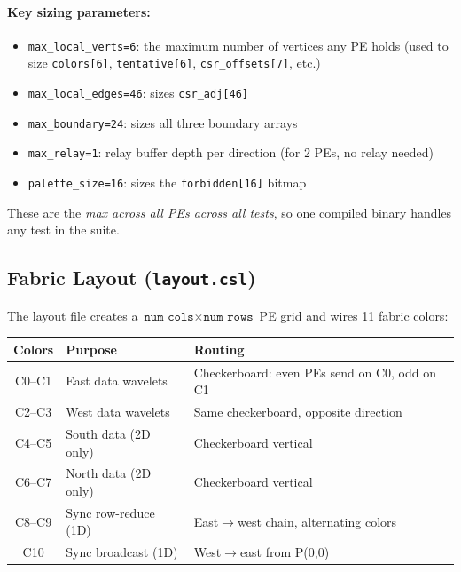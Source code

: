 \documentclass[11pt,letterpaper]{article}
\begin{document}
\paragraph{Key sizing parameters:}
\begin{itemize}[nosep]
  \item \texttt{max\_local\_verts=6}: the maximum number of vertices any PE holds (used to size \texttt{colors[6]}, \texttt{tentative[6]}, \texttt{csr\_offsets[7]}, etc.)
  \item \texttt{max\_local\_edges=46}: sizes \texttt{csr\_adj[46]}
  \item \texttt{max\_boundary=24}: sizes all three boundary arrays
  \item \texttt{max\_relay=1}: relay buffer depth per direction (for 2 PEs, no relay needed)
  \item \texttt{palette\_size=16}: sizes the \texttt{forbidden[16]} bitmap
\end{itemize}

These are the \emph{max across all PEs across all tests}, so one compiled binary handles any test in the suite.

\subsection{Fabric Layout (\texttt{layout.csl})}

The layout file creates a $\texttt{num\_cols} \times \texttt{num\_rows}$ PE grid and wires 11 fabric colors:

\begin{center}
\renewcommand{\arraystretch}{1.2}
\begin{tabular}{cll}
\toprule
\textbf{Colors} & \textbf{Purpose} & \textbf{Routing} \\
\midrule
C0--C1 & East data wavelets & Checkerboard: even PEs send on C0, odd on C1 \\
C2--C3 & West data wavelets & Same checkerboard, opposite direction \\
C4--C5 & South data (2D only) & Checkerboard vertical \\
C6--C7 & North data (2D only) & Checkerboard vertical \\
C8--C9 & Sync row-reduce (1D) & East$\to$west chain, alternating colors \\
C10    & Sync broadcast (1D)  & West$\to$east from P(0,0) \\
\bottomrule
\end{tabular}
\end{center}
\end{document}
